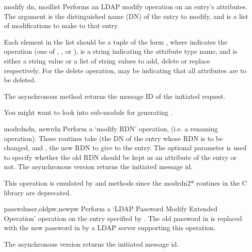 \begin{methoddesc}[LDAPObject]{modify}{ dn, modlist } %
Performs an LDAP modify operation on an entry's attributes. 
The  argument is the distinguished name (DN) of the entry to modify,
and  is a list of modifications to make to that entry.

Each element in the list  should be a tuple of the form 
,
where  indicates the operation (one of , 
, or ),
 is a string indicating the attribute type name, and 
 is either a string value or a list of string values to add, 
delete or replace respectively.  For the delete operation, 
may be  indicating that all attributes are to be deleted.

The asynchronous method  returns the message ID of the 
initiated request.

You might want to look into sub-module  for
generating .
\end{methoddesc}


\begin{methoddesc}[LDAPObject]{modrdn}{dn, newrdn }
Perform a `modify RDN' operation, (i.e. a renaming operation).
These routines take  (the DN
of the entry whose RDN is to be changed, and , the new RDN to
give to the entry. The optional parameter  is used to specify
whether the old RDN should be kept as an attribute of the entry or not.
The asynchronous version returns the initiated message id.

This operation is emulated by  and  methods
since the modrdn2* routines in the C library are deprecated.
\end{methoddesc}


\begin{methoddesc}[LDAPObject]{passwd}{user,oldpw,newpw}
Perform a `LDAP Password Modify Extended Operation' operation
on the entry specified by .
The old password in  is replaced with the new
password in  by a LDAP server supporting this operation.

The asynchronous version returns the initiated message id.

\begin{seealso}
\end{seealso}

\end{methoddesc}


